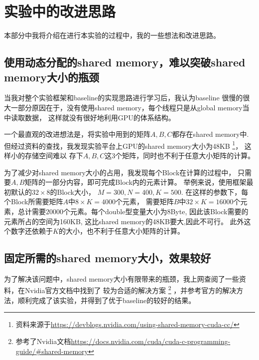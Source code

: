 \documentclass[UTF8]{article}
\begin{document}
\section{实验中的改进思路}
本部分中我将介绍在进行本实验的过程中，我的一些想法和改进思路。
\subsection{使用动态分配的shared memory，难以突破shared memory大小的瓶颈}
当我对整个实验框架和baseline的实现思路进行学习后，我认为baseline
很慢的很大一部分原因在于，没有使用shared memory，每个线程只是从global memory当中读取数据，
这样就没有很好地利用GPU的体系结构。

一个最直观的改进想法是，将实验中用到的矩阵$A,B,C$都存在shared memory中.
但经过资料的查找，我发现实验平台上GPU的shared memory大小为48KB
\footnote{资料来源于\url{https://devblogs.nvidia.com/using-shared-memory-cuda-cc/}}，
这样小的存储空间难以
存下$A,B,C$这3个矩阵，同时也不利于任意大小矩阵的计算。

为了减少对shared memory大小的占用，我发现每个Block在计算的过程中，
只需要$A, B$矩阵的一部分内容，即可完成Block内的元素计算。
举例来说，使用框架最初默认的$32\times 8$的Block大小，
$M=300, N=400, K=500$. 在这样的参数下，每个Block所需要矩阵$A$中$8\times K=4000$个元素，
需要矩阵$B$中$32\times K=16000$个元素，总计需要$20000$个元素。每个double型变量大小为8Byte,
因此该Block需要的元素所占的空间为160KB, 这比shared memory的48KB要大,因此不可行。
此外这个数字还依赖于$K$的大小，也不利于任意大小矩阵的计算。

\subsection{固定所需的shared memory大小，效果较好}
为了解决该问题中，shared memory大小有限带来的瓶颈，我上网查阅了一些资料，在Nvidia官方文档中找到了
较为合适的解决方案
\footnote{参考了Nvidia文档\url{https://docs.nvidia.com/cuda/cuda-c-programming-guide/#shared-memory}}
，并参考官方的解决方法，顺利完成了该实验，并得到了优于baseline的较好的结果。
\end{document}
